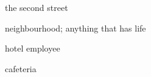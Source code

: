 \begin{flashcard}{\LARGE the second street}
\LARGE {}
\end{flashcard}
\begin{flashcard}{\LARGE neighbourhood; anything that has life}
\LARGE {}
\end{flashcard}
\begin{flashcard}{\LARGE hotel employee}
\LARGE {}
\end{flashcard}
\begin{flashcard}{\LARGE cafeteria}
\LARGE {}
\end{flashcard}

